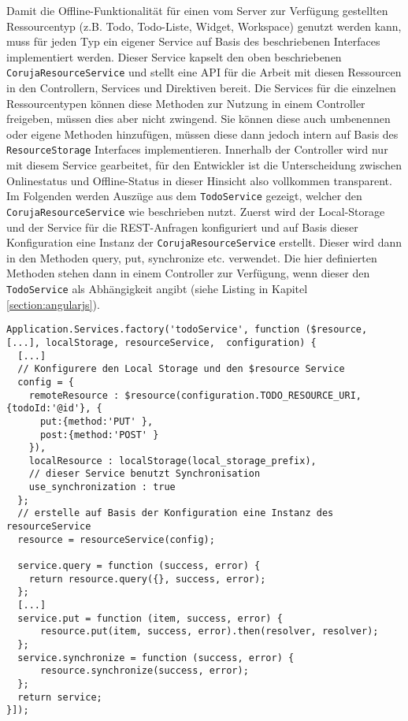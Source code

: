 Damit die Offline-Funktionalität für einen vom Server zur Verfügung gestellten Ressourcentyp (z.B. Todo, Todo-Liste, Widget, Workspace) genutzt werden kann, muss für jeden Typ ein eigener Service auf Basis des beschriebenen Interfaces implementiert werden. Dieser Service kapselt den oben beschriebenen \texttt{CorujaResourceService} und stellt eine API für die Arbeit mit diesen Ressourcen in den Controllern, Services und Direktiven bereit. Die Services für die einzelnen Ressourcentypen können diese Methoden zur Nutzung in einem Controller freigeben, müssen dies aber nicht zwingend. Sie können diese auch umbenennen oder eigene Methoden hinzufügen, müssen diese dann jedoch intern auf Basis des \texttt{ResourceStorage} Interfaces implementieren. Innerhalb der Controller wird nur mit diesem Service gearbeitet, für den Entwickler ist die Unterscheidung zwischen Onlinestatus und Offline-Status in dieser Hinsicht also vollkommen transparent. Im Folgenden werden Auszüge aus dem \texttt{TodoService} gezeigt, welcher den \texttt{CorujaResourceService} wie beschrieben nutzt. Zuerst wird der Local-Storage und der Service für die REST-Anfragen konfiguriert und auf Basis dieser Konfiguration eine Instanz der \texttt{CorujaResourceService} erstellt. Dieser wird dann in den Methoden query, put, synchronize etc. verwendet. Die hier definierten Methoden stehen dann in einem Controller zur Verfügung, wenn dieser den \texttt{TodoService} als Abhängigkeit angibt (siehe Listing in Kapitel \ref{section:angularjs}).
\begin{lstlisting}
Application.Services.factory('todoService', function ($resource, [...], localStorage, resourceService,  configuration) {
  [...]
  // Konfigurere den Local Storage und den $resource Service
  config = {
    remoteResource : $resource(configuration.TODO_RESOURCE_URI, {todoId:'@id'}, {
      put:{method:'PUT' },
      post:{method:'POST' }
    }),
    localResource : localStorage(local_storage_prefix),
    // dieser Service benutzt Synchronisation
    use_synchronization : true
  };   
  // erstelle auf Basis der Konfiguration eine Instanz des resourceService
  resource = resourceService(config);
    
  service.query = function (success, error) {
    return resource.query({}, success, error);
  }; 
  [...]
  service.put = function (item, success, error) {
      resource.put(item, success, error).then(resolver, resolver);
  };  
  service.synchronize = function (success, error) {
      resource.synchronize(success, error);
  };
  return service;
}]);
\end{lstlisting}

